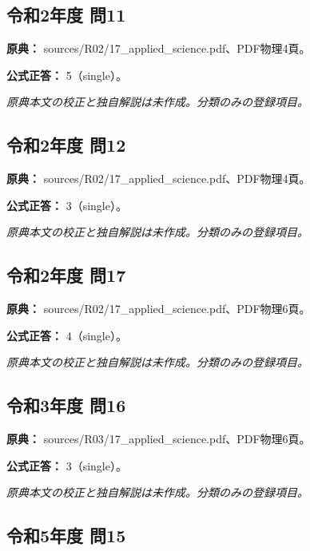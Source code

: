 \subsection{令和2年度 問11}
\label{q:r02-reg-applied-11}

\noindent\textbf{原典：} sources/R02/17\_applied\_science.pdf、PDF物理4頁。

\textbf{公式正答：} 5（single）。

\par\textit{原典本文の校正と独自解説は未作成。分類のみの登録項目。}

\subsection{令和2年度 問12}
\label{q:r02-reg-applied-12}

\noindent\textbf{原典：} sources/R02/17\_applied\_science.pdf、PDF物理4頁。

\textbf{公式正答：} 3（single）。

\par\textit{原典本文の校正と独自解説は未作成。分類のみの登録項目。}

\subsection{令和2年度 問17}
\label{q:r02-reg-applied-17}

\noindent\textbf{原典：} sources/R02/17\_applied\_science.pdf、PDF物理6頁。

\textbf{公式正答：} 4（single）。

\par\textit{原典本文の校正と独自解説は未作成。分類のみの登録項目。}

\subsection{令和3年度 問16}
\label{q:r03-reg-applied-16}

\noindent\textbf{原典：} sources/R03/17\_applied\_science.pdf、PDF物理6頁。

\textbf{公式正答：} 3（single）。

\par\textit{原典本文の校正と独自解説は未作成。分類のみの登録項目。}

\subsection{令和5年度 問15}
\label{q:r05-reg-applied-15}

